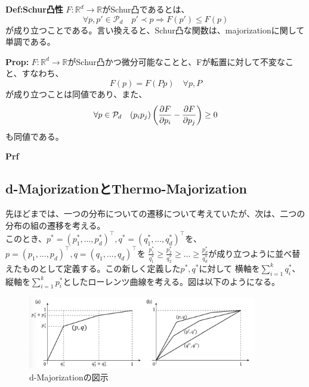 \documentclass[a4paper,11pt]{jsarticle}
\numberwithin{equation}{section}
\begin{document}
\begin{itembox}[l]{\textbf{Def:Schur凸性}}
    $F: \mathbb{R}^d \to \mathbb{R}$がSchur凸であるとは、
    \begin{equation}
        \forall p,p' \in \mathcal{P}_d \quad p' \prec p \Rightarrow F(p') \leq F(p)
    \end{equation}
    が成り立つことである。言い換えると、Schur凸な関数は、majorizationに関して単調である。
\end{itembox}

\begin{itembox}[l]{\textbf{Prop:}}
    $F: \mathbb{R}^d \to \mathbb{R}$がSchur凸かつ微分可能なことと、Fが転置に対して不変なこと、すなわち、
    \begin{equation}
        F(p) = F(Pp) \quad \forall p ,P
    \end{equation}
    が成り立つことは同値であり、また、
    \begin{equation}
        \forall p \in \mathcal{P}_d \quad (p_ip_j)\left(\pdv{F}{p_i}-\pdv{F}{p_j}\right)\geq 0
    \end{equation}
    も同値である。
\end{itembox}
\textbf{Prf}\\

\subsection{d-MajorizationとThermo-Majorization}
先ほどまでは、一つの分布についての遷移について考えていたが、次は、二つの分布の組の遷移を考える。\\
このとき、$p^*=(p_1^*,...,p_d^*)^{\top},q^*=(q_1^*,...,q_d^*)^{\top}$を、$p=(p_1,...,p_d)^{\top},q=(q_1,...,q_d)^{\top}$を
$\frac{p_1^*}{q_1^*} \geq \frac{p_2^*}{q_2^*} \geq ... \geq \frac{p_d^*}{q_d^*}$が成り立つように並べ替えたものとして定義する。この新しく定義した$p^*,q^*$に対して
横軸を$\sum_{i=1}^{k}q_i^*$、縦軸を$\sum_{i=1}^{k}p_i^*$としたローレンツ曲線を考える。図は以下のようになる。\\
\begin{figure}[H]
    \begin{center}
    \includegraphics[width=100mm]{image2.png}
    \end{center}
    \caption{d-Majorizationの図示}
    \label{fig:two}
\end{figure}
\end{document}
